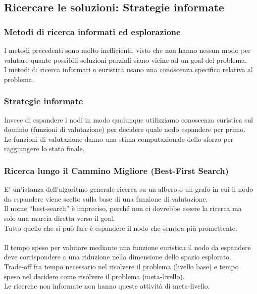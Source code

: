 \documentclass[../main.tex]{subfiles}
\begin{document}
	\subsection{Ricercare le soluzioni: Strategie informate}
	\subsubsection{Metodi di ricerca informati ed esplorazione}
	I metodi precedenti sono molto inefficienti, visto che non hanno nessun modo per valutare quante possibili soluzioni parziali siano vicine ad un goal del problema. \\
	I metodi di ricerca informati o euristica usano una conoscenza specifica relativa al problema.
	\subsubsection{Strategie informate}
	Invece di espandere i nodi in modo qualunque utilizziamo conoscenza euristica sul dominio (funzioni di valutazione) per decidere quale nodo espandere per primo. \\
	Le funzioni di valutazione danno una stima computazionale dello sforzo per raggiungere lo stato finale.
	\subsubsection{Ricerca lungo il Cammino Migliore (Best-First Search)}
	E’ un’istanza dell’algoritmo generale ricerca su un albero o un grafo in cui il nodo da espandere viene scelto sulla base di una funzione di valutazione. \\
	Il nome “best-search” è impreciso, perché non ci dovrebbe essere la ricerca ma solo una marcia diretta verso il goal. \\
	Tutto quello che si può fare è espandere il nodo che sembra più promettente.\\ \\
	Il tempo speso per valutare mediante una funzione euristica il nodo da espandere deve corrispondere a una riduzione nella dimensione dello spazio esplorato. \\
	Trade-off fra tempo necessario nel risolvere il problema (livello base) e tempo speso nel decidere come risolvere il problema (meta-livello). \\
	Le ricerche non informate non hanno queste attività di meta-livello.
\end{document}
